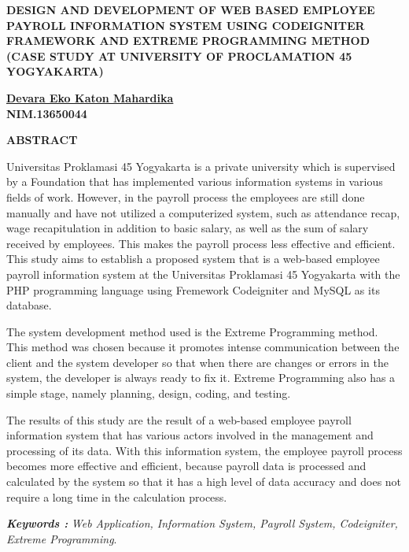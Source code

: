 \documentclass{jtetiskripsi}
\begin{document}
\begin{abstracteng}
\begin{center}
    \textbf{DESIGN AND DEVELOPMENT OF WEB BASED EMPLOYEE PAYROLL INFORMATION SYSTEM USING CODEIGNITER FRAMEWORK AND EXTREME PROGRAMMING METHOD}\\
    \textbf{(CASE STUDY AT UNIVERSITY OF PROCLAMATION 45 YOGYAKARTA)}
\end{center}

\begin{center}
    \textbf{\underline{Devara Eko Katon Mahardika}\\NIM.13650044}
\end{center}

\begin{center}
    \textbf{ABSTRACT}
\end{center}

Universitas Proklamasi 45 Yogyakarta is a private university which is supervised by a Foundation that has implemented various information systems in various fields of work. However, in the payroll process the employees are still done manually and have not utilized a computerized system, such as attendance recap, wage recapitulation in addition to basic salary, as well as the sum of salary received by employees. This makes the payroll process less effective and efficient. This study aims to establish a proposed system that is a web-based employee payroll information system at the Universitas Proklamasi 45 Yogyakarta with the PHP programming language using Fremework Codeigniter and MySQL as its database.

The system development method used is the Extreme Programming method. This method was chosen because it promotes intense communication between the client and the system developer so that when there are changes or errors in the system, the developer is always ready to fix it. Extreme Programming also has a simple stage, namely planning, design, coding, and testing.

The results of this study are the result of a web-based employee payroll information system that has various actors involved in the management and processing of its data. With this information system, the employee payroll process becomes more effective and efficient, because payroll data is processed and calculated by the system so that it has a high level of data accuracy and does not require a long time in the calculation process.

\bigskip
\noindent
\textbf{\emph{Keywords :}} \emph{Web Application, Information System, Payroll System, Codeigniter, Extreme Programming}.
\end{abstracteng}
\end{document}
